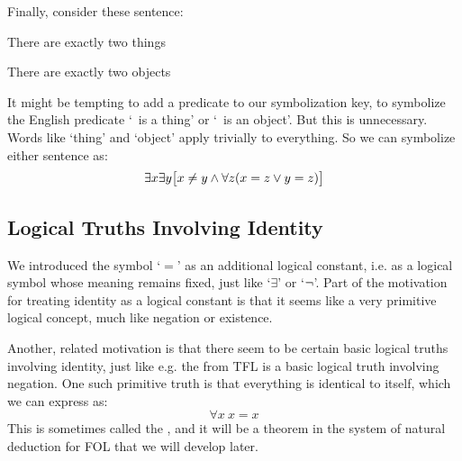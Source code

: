 Finally, consider these sentence:
\begin{earg}
\item[\ex{exactly2things}] There are exactly two things
\item[\ex{exactly2objects}] There are exactly two objects
\end{earg}
It might be tempting to add a predicate to our symbolization key, to symbolize the English predicate `\blank\ is a thing' or `\blank\ is an object'. But this is unnecessary. Words like `thing' and `object' apply trivially to everything. So we can symbolize either sentence as:
		$$\exists x \exists y \bigl[x \neq y \wedge \forall z(x=z \vee y = z)\bigr]$$

\subsection{Logical Truths Involving Identity}\label{s:LogicalTruthsID}

We introduced the symbol `$=$' as an additional logical constant, i.e. as a logical symbol whose meaning remains fixed, just like `$\exists$' or `$\neg$'.  Part of the motivation for treating identity as a logical constant is that it seems like a very primitive logical concept, much like negation or existence.

Another, related motivation is that there seem to be certain basic logical truths involving identity, just like e.g. the  from TFL  is a basic logical truth involving negation.  One such primitive truth is that everything is identical to itself, which we can express as:
$$\forall x\ x= x$$
This is sometimes called the , and it will be a theorem in the system of natural deduction for FOL that we will develop later.

